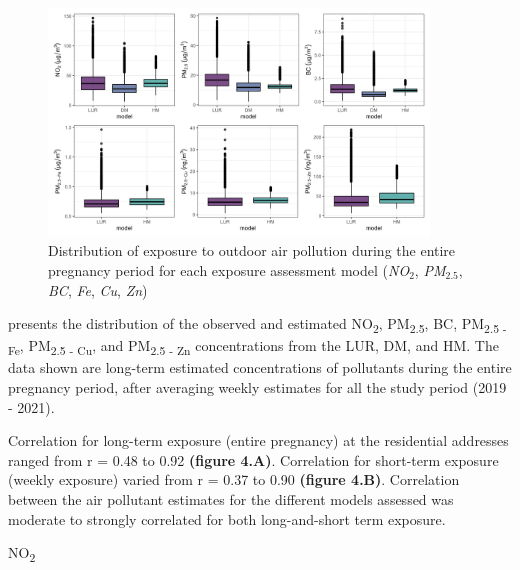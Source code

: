 \documentclass{article}
\begin{document}
\begin{figure}[!htb]
\includegraphics[width=0.9\textwidth]{figures/boxplot_all_models_estimates.png}
\caption{Distribution of exposure to outdoor air pollution during the entire pregnancy period for each exposure assessment model (\textit{NO$_2$}, \textit{PM$_{2.5}$}, \textit{BC}, \textit{Fe}, \textit{Cu}, \textit{Zn})}
\label{fig4}
\end{figure}

\textbf{} presents the distribution of the observed and estimated NO\textsubscript{2}, PM\textsubscript{2.5}, BC,  PM\textsubscript{2.5 - Fe}, PM\textsubscript{2.5 - Cu}, and PM\textsubscript{2.5 - Zn} concentrations from the LUR, DM, and HM. The data shown are long-term estimated concentrations of pollutants during the entire pregnancy period, after averaging weekly estimates for all the study period (2019 - 2021).   
\newpage

Correlation for long-term exposure (entire pregnancy) at the residential addresses ranged from r = 0.48 to 0.92 \textbf{(figure 4.A)}. Correlation for short-term exposure (weekly exposure) varied from r = 0.37 to 0.90 \textbf{(figure 4.B)}. Correlation between the air pollutant estimates for the different models assessed was moderate to strongly correlated for both long-and-short term exposure. 

NO\textsubscript{2}
\end{document}
